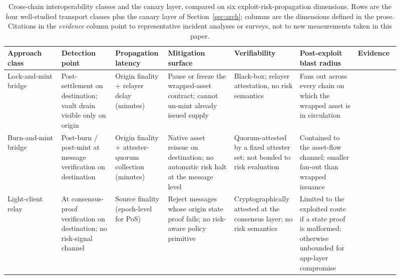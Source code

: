 \documentclass[journal]{IEEEtran}
\begin{document}
\begin{table}[t]
\centering
\scriptsize
\caption{Cross-chain interoperability classes and the canary layer,
compared on six exploit-risk-propagation dimensions. Rows are the four
well-studied transport classes plus the canary layer of
Section~\ref{sec:arch}; columns are the dimensions defined in the
prose. Citations in the \emph{evidence} column point to representative
incident analyses or surveys, not to new measurements taken in this
paper.}
\label{tab:exploit-propagation-comparison}
\renewcommand{\arraystretch}{1.20}
\setlength{\tabcolsep}{3pt}
\begin{tabular}{@{}>{\raggedright\arraybackslash}p{0.13\linewidth} >{\raggedright\arraybackslash}p{0.13\linewidth} >{\raggedright\arraybackslash}p{0.11\linewidth} >{\raggedright\arraybackslash}p{0.16\linewidth} >{\raggedright\arraybackslash}p{0.14\linewidth} >{\raggedright\arraybackslash}p{0.14\linewidth} >{\raggedright\arraybackslash}p{0.10\linewidth}@{}}
\toprule
\textbf{Approach class} &
\textbf{Detection point} &
\textbf{Propagation latency} &
\textbf{Mitigation surface} &
\textbf{Verifiability} &
\textbf{Post-exploit blast radius} &
\textbf{Evidence} \\
\midrule
Lock-and-mint bridge &
Post-settlement on destination; vault drain visible only on origin &
Origin finality + relayer delay (minutes) &
Pause or freeze the wrapped-asset contract; cannot un-mint already issued supply &
Black-box; relayer attestation, no risk semantics &
Fans out across every chain on which the wrapped asset is in circulation &
\cite{augusto2024sok,zhang2023sok} \\
\midrule
Burn-and-mint bridge &
Post-burn / post-mint at message verification on destination &
Origin finality + attester-quorum collection (minutes) &
Native asset reissue on destination; no automatic risk halt at the message level &
Quorum-attested by a fixed attester set; not bonded to risk evaluation &
Contained to the asset-flow channel; smaller fan-out than wrapped issuance &
\cite{augusto2024sok,wu2025safeguarding} \\
\midrule
Light-client relay &
At consensus-proof verification on destination; no risk-signal channel &
Source finality (epoch-level for PoS) &
Reject messages whose origin state proof fails; no risk-aware policy primitive &
Cryptographically attested at the consensus layer; no risk semantics &
Limited to the exploited route if a state proof is malformed; otherwise unbounded for app-layer compromise &
\cite{zhang2023sok,werner2022sok} \\

\end{tabular}
\end{table}
\end{document}
